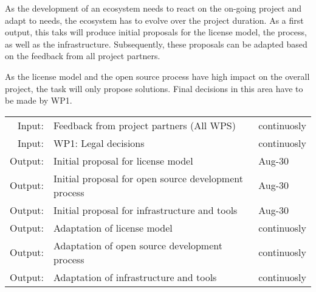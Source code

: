 \documentclass[11pt, a4paper]{article}
\newenvironment{inoutput}
{\vspace{2mm}
\noindent
\begin{tabular}{|r|p{.68\linewidth}|l|}
\hline}
{
\hline
\end{tabular}}
\begin{document}
As the development of an ecosystem needs to react on the on-going project and adapt to needs, the ecosystem has to evolve over the project duration. As a first output, this taks will produce initial proposals for the license model, the process, as well as the infrastructure. Subsequently, these proposals can be adapted based on the feedback from all project partners.

As the license model and the open source process have high impact on the overall project, the task will only propose solutions. Final decisions in this area have to be made by WP1. 

\begin{inoutput}
Input: & Feedback from project partners (All WPS) & continuosly \\
Input: & WP1: Legal decisions & continuosly \\
Output: & Initial proposal for license model & Aug-30 \\
Output: & Initial proposal for open source development process & Aug-30 \\
Output: & Initial proposal for infrastructure and tools & Aug-30 \\
Output: & Adaptation of license model & continuosly \\
Output: & Adaptation of open source development process & continuosly \\
Output: & Adaptation of infrastructure and tools & continuosly \\
\end{inoutput}
\end{document}
